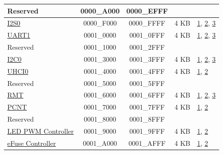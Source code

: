 \begin{longtable}[c]{ |p{5.0cm}|c|c|r|p{1.5cm}| }
    \rowcolor{gray!25}
   Reserved  & \hexprefix{}0000\_A000 & \hexprefix{}0000\_EFFF &        &             \\\hline
             \hyperref[mod:i2s]{I2S0}      & \hexprefix{}0000\_F000 & \hexprefix{}0000\_FFFF &   4 KB &         \hyperref[PAM footnote: 1]{1}, \hyperref[PAM footnote: 2]{2}, \hyperref[PAM footnote: 3]{3}  \\\hline

              \hyperref[mod:uart]{UART1}     & \hexprefix{}0001\_0000 & \hexprefix{}0001\_0FFF &   4 KB &      \hyperref[PAM footnote: 1]{1}, \hyperref[PAM footnote: 2]{2}, \hyperref[PAM footnote: 3]{3}  \\\hline

    \rowcolor{gray!25}
  Reserved  & \hexprefix{}0001\_1000 & \hexprefix{}0001\_2FFF &        &                \\\hline
           \hyperref[mod:i2c]{I2C0}        & \hexprefix{}0001\_3000 & \hexprefix{}0001\_3FFF &   4 KB &            \hyperref[PAM footnote: 1]{1}, \hyperref[PAM footnote: 2]{2}, \hyperref[PAM footnote: 3]{3}  \\\hline
               \hyperref[mod:uart]{UHCI0}    & \hexprefix{}0001\_4000 & \hexprefix{}0001\_4FFF &   4 KB &         \hyperref[PAM footnote: 1]{1}, \hyperref[PAM footnote: 2]{2}     \\\hline

    \rowcolor{gray!25}
 Reserved     & \hexprefix{}0001\_5000 & \hexprefix{}0001\_5FFF &        &               \\\hline
              \hyperref[mod:rmt]{RMT}      & \hexprefix{}0001\_6000 & \hexprefix{}0001\_6FFF &   4 KB &      \hyperref[PAM footnote: 1]{1}, \hyperref[PAM footnote: 2]{2}, \hyperref[PAM footnote: 3]{3}  \\\hline
               \hyperref[mod:pcnt]{PCNT}    & \hexprefix{}0001\_7000 & \hexprefix{}0001\_7FFF &   4 KB &         \hyperref[PAM footnote: 1]{1}, \hyperref[PAM footnote: 2]{2}     \\\hline

    \rowcolor{gray!25}
  Reserved   & \hexprefix{}0001\_8000 & \hexprefix{}0001\_8FFF &        &             \\\hline
             \hyperref[mod:ledpwm]{LED PWM Controller}    & \hexprefix{}0001\_9000 & \hexprefix{}0001\_9FFF &   4 KB &        \hyperref[PAM footnote: 1]{1}, \hyperref[PAM footnote: 2]{2}     \\\hline
            \hyperref[mod:efuse]{eFuse Controller}       & \hexprefix{}0001\_A000 & \hexprefix{}0001\_AFFF &   4 KB & \hyperref[PAM footnote: 1]{1}, \hyperref[PAM footnote: 2]{2}     \\\hline


\end{longtable}
